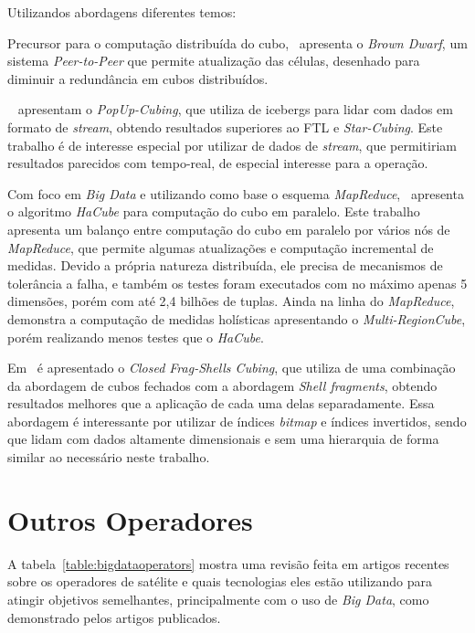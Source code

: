 Utilizandos abordagens diferentes temos:

Precursor para o computação distribuída do cubo,~\cite{dokaBrownDwarfFullydistributed2011} apresenta o \textit{Brown Dwarf}, um sistema \textit{Peer-to-Peer} que permite atualização das células, desenhado para diminuir a redundância em cubos distribuídos.

~\cite{heinePopUpCubingAlgorithmEfficiently2017} apresentam o \textit{PopUp-Cubing}, que utiliza de icebergs para lidar com dados em formato de \textit{stream}, obtendo resultados superiores ao FTL e \textit{Star-Cubing}.
Este trabalho é de interesse especial por utilizar de dados de \textit{stream}, que permitiriam resultados parecidos com tempo-real, de especial interesse para a operação.

Com foco em \textit{Big Data} e utilizando como base o esquema \textit{MapReduce},~\cite{wangScalableDataCube2013} apresenta o algoritmo \textit{HaCube} para computação do cubo em paralelo.
Este trabalho apresenta um balanço entre computação do cubo em paralelo por vários nós de \textit{MapReduce}, que permite algumas atualizações e computação incremental de medidas.
Devido a própria natureza distribuída, ele precisa de mecanismos de tolerância a falha, e também os testes foram executados com no máximo apenas 5 dimensões, porém com até 2,4 bilhões de tuplas.
Ainda na linha do \textit{MapReduce},~\cite{yangHolisticAlgebraicData2017} demonstra a computação de medidas holísticas apresentando o \textit{Multi-RegionCube}, porém realizando menos testes que o \textit{HaCube}.

Em~\cite{zhaoClosedFragShellsCubing2018} é apresentado o \textit{Closed Frag-Shells Cubing}, que utiliza de uma combinação da abordagem de cubos fechados com a abordagem \textit{Shell fragments}, obtendo resultados melhores que a aplicação de cada uma delas separadamente.
Essa abordagem é interessante por utilizar de índices \textit{bitmap} e índices invertidos, sendo que lidam com dados altamente dimensionais e sem uma hierarquia de forma similar ao necessário neste trabalho.

\section{Outros Operadores}
\label{ch:corr:ops}

A tabela~\ref{table:bigdataoperators} mostra uma revisão feita em artigos recentes sobre os operadores de satélite e quais tecnologias eles estão utilizando para atingir objetivos semelhantes, principalmente com o uso de \textit{Big Data}, como demonstrado pelos artigos publicados.


